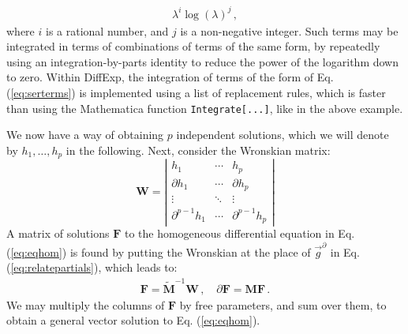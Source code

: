 \documentclass{article}
\begin{document}
\begin{align}  
    \label{eq:serterms}
    \lambda^{i} \log (\lambda)^{j}\,,
\end{align}
where $i$ is a rational number, and $j$ is a non-negative integer. Such terms may be integrated in terms of combinations of terms of the same form, by repeatedly using an integration-by-parts identity to reduce the power of the logarithm down to zero. Within DiffExp, the integration of terms of the form of Eq. (\ref{eq:serterms}) is implemented using a list of replacement rules, which is faster than using the Mathematica function \texttt{Integrate[...]}, like in the above example.

We now have a way of obtaining $p$ independent solutions, which we will denote by $h_1,\ldots,h_p$ in the following. Next, consider the Wronskian matrix:
\begin{equation}
\label{eq:wronsk}
\mathbf{W}=\left|\begin{array}{ccc}
h_{1} & \cdots & h_{p} \\
\partial h_{1} & \cdots & \partial h_{p} \\
\vdots & \ddots & \vdots \\
\partial^{p-1} h_{1} & \cdots & \partial^{p-1} h_{p}
\end{array}\right|
\end{equation}
A matrix of solutions $\mathbf{F}$ to the homogeneous differential equation in Eq. (\ref{eq:eqhom}) is found by putting the Wronskian at the place of $\vec{g}^\partial$ in Eq. (\ref{eq:relatepartials}), which leads to:
\begin{align}
    \label{eq:Fmatdefinition}
    \mathbf{F} = \tilde{\mathbf{M}}^{-1} \mathbf{W}\,,\quad \partial \mathbf{F} = \mathbf{M} \mathbf{F}\,.
\end{align}
We may multiply the columns of $\mathbf{F}$ by free parameters, and sum over them, to obtain a general vector solution to Eq. (\ref{eq:eqhom}).
\end{document}
